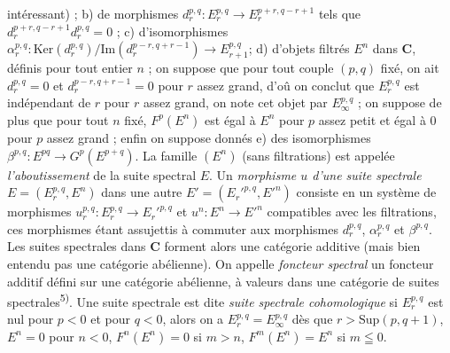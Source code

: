 intéressant) ; b) de morphismes
$d_r^{p,q}:E_r^{p,q}\to E_r^{p+r,q-r+1}$
tels que $d_r^{p+r,q-r+1}d_r^{p,q}=0$ ; c) d'isomorphismes
$\alpha_r^{p,q}:
\mathrm{Ker}(d_r^{p,q})/\mathrm{Im}(d_r^{p-r,q+r-1})
\to E_{r+1}^{p,q}$;
d) d'objets filtrés $E^n$ dans $\mathbf{C}$, définis pour tout entier $n$ ; on suppose
que pour tout couple $(p,q)$ fixé, on ait $d_r^{p,q}=0$ et
$d_r^{p-r,q+r-1}=0$ pour $r$ assez grand, d'oû on conclut que $E_r^{p,q}$ est
indépendant de $r$ pour $r$ assez grand, on note cet objet par
$E_\infty^{p,q}$ ; on suppose de plus que pour tout $n$ fixé, $F^p(E^n)$ est
égal à $E^n$ pour $p$ assez petit et égal à 0 pour $p$ assez grand ; enfin on
suppose donnés e) des isomorphismes
$\beta^{p,q}:E^{pq}\to G^p(E^{p+q})$.
La famille $(E^n)$ (sans filtrations) est appelée \textit{l'aboutissement} de
la suite spectral $E$.
Un \textit{morphisme $u$ d'une suite spectrale}
$E=(E_r^{p,q},E^n)$ dans une autre $E'=(E_r'^{p,q},E'^n)$ consiste en un
système de morphismes
$u_r^{p,q}:E_r^{p,q}\to E_r'^{p,q}$ et
$u^n:E^n\to E'^n$ compatibles avec les filtrations, ces morphismes
étant assujettis à commuter aux morphismes $d_r^{p,q}$,
$\alpha_r^{p,q}$ et $\beta^{p,q}$. Les suites spectrales dans $\mathbf{C}$ forment alors
une catégorie additive (mais bien entendu pas une catégorie abélienne).
On appelle \textit{foncteur spectral} un foncteur additif défini sur une
catégorie abélienne, à valeurs dans une catégorie de suites
spectrales\textsuperscript{5)}.
Une suite spectrale est dite \textit{suite spectrale cohomologique} si
$E_r^{p,q}$ est nul pour $p<0$ et pour $q<0$, alors on a
$E_r^{p,q}=E_\infty^{p,q}$ dès que $r>\mathrm{Sup}(p,q+1)$, $E^n=0$ pour
$n<0$, $F^n(E^n)=0$ si $m>n$, $F^m(E^n)=E^n$ si $m\leqq0$.

